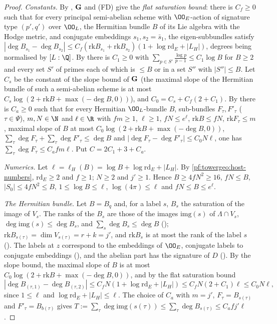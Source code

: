 \begin{proof}
\emph{Constants.} By , $\mathbf G$ and
(FD) give the \emph{flat saturation bound}: there is $C_f\ge0$ such that for every principal semi-abelian scheme with
$\OO_E$-action of signature type $(p',q')$ over $\OO_L$, the Hermitian bundle $B$ of its Lie algebra with the Hodge
metric, and conjugate embeddings $s_1,s_2=\bar s_1$, the eigen-subbundles satisfy
$|\deg B_{s_1}-\deg B_{s_2}|\le C_f(\mathrm{rk}B_{s_1}+\mathrm{rk}B_{s_2})(1+\log\mathrm{rd}_E+|L_H|)$, degrees being
normalised by $[L:\Q]$. By  there is $C_1\ge0$ with
$\sum_{p\in S'}\frac{\log p}{p-1}\le C_1\log B$ for $B\ge2$ and every set $S'$ of primes each of which is $\le B$ or in a
set $S''$ with $|S''|\le B$. Let $C_s$ be the constant of the slope bound of $\mathbf G$ (the maximal slope of the
Hermitian bundle of such a semi-abelian scheme is at most $C_s\log(2+\mathrm{rk}B+\max(-\deg B,0))$), and
$C_0=C_s+C_f(2+C_1)$. By  there is $C_a\ge0$ such that for every Hermitian
$\OO_L$-bundle $B$, sub-bundles $F_\tau,F'_\tau$ ($\tau\in\Psi$), $m,N\in\N$ and $\ell\in\R$ with $fm\ge1$, $\ell\ge1$,
$fN\le e^\ell$, $\mathrm{rk}B\le fN$, $\mathrm{rk}F_\tau\le m$, maximal slope of $B$ at most
$C_0\log(2+\mathrm{rk}B+\max(-\deg B,0))$, $\sum_\tau\deg F_\tau+\sum_\tau\deg F'_\tau\le\deg B$ and
$|\deg F_\tau-\deg F'_\tau|\le C_0N\ell$, one has $\sum_\tau\deg F_\tau\le C_afm\ell$. Put $C=2C_1+3+C_a$.

\emph{Numerics.} Let $\ell=\ell_H(B)=\log B+\log\mathrm{rd}_E+|L_H|$. By \cref{pf:towergeo:host-numbers},
$\mathrm{rd}_E\ge2$ and $f\ge1$; $N\ge2$ and $j'\ge1$. Hence $B\ge4fN^2\ge16$, $fN\le B$, $|S_0|\le4fN^2\le B$,
$1\le\log B\le\ell$, $\log(4\pi)\le\ell$ and $fN\le B\le e^\ell$.

\emph{The Hermitian bundle.} Let $B=B_q$ and, for a label $s$, $B_s$ the saturation of the image of $V_s$. The ranks
of the $B_s$ are those of the images $\mathrm{img}(s)$ of $\Lambda\cap V_s$, $\deg\mathrm{img}(s)\le\deg B_s$, and
$\sum_s\deg B_s\le\deg B$ (); $\mathrm{rk}B_{s(\tau)}=\dim V_{s(\tau)}=r+k=j'$, and
$\mathrm{rk}B_s$ is at most the rank of the label $s$ ().
The labels at $z$ correspond to the embeddings of $\OO_E$, conjugate labels to conjugate embeddings
(), and the abelian part has the signature of $D$
(). By the slope bound, the maximal slope of $B$ is at most
$C_0\log(2+\mathrm{rk}B+\max(-\deg B,0))$, and by the flat saturation bound
\[
|\deg B_{(\tau,1)}-\deg B_{(\tau,2)}|\le C_fN(1+\log\mathrm{rd}_E+|L_H|)\le C_fN(2+C_1)\ell\le C_0N\ell,
\]
since $1\le\ell$ and $\log\mathrm{rd}_E+|L_H|\le\ell$. The choice of $C_a$ with $m=j'$, $F_\tau=B_{s(\tau)}$ and
$F'_\tau=B_{b(\tau)}$ gives $T:=\sum_\tau\deg\mathrm{img}(s(\tau))\le\sum_\tau\deg B_{s(\tau)}\le C_afj'\ell$.


\end{proof}
